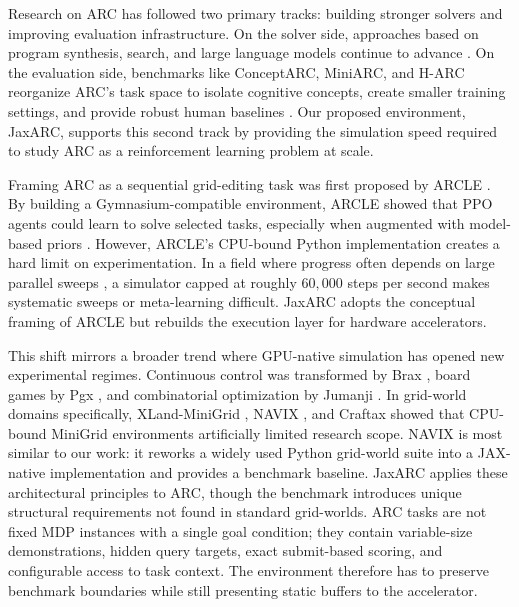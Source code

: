 Research on ARC has followed two primary tracks: building stronger solvers and improving evaluation infrastructure. On the solver side, approaches based on program synthesis, search, and large language models continue to advance \citep{alfordNeuralGuidedBidirectionalProgram2022,buttCodeItSelfimprovingLanguage2024,batorskiNSANeurosymbolicARC2025}. On the evaluation side, benchmarks like ConceptARC, MiniARC, and H-ARC reorganize ARC's task space to isolate cognitive concepts, create smaller training settings, and provide robust human baselines \citep{kimPlaygroundsAbstractionReasoning2022,moskvichevConceptARCBenchmarkEvaluating2023,legrisComprehensiveBehavioralDataset2025}. Our proposed environment, JaxARC, supports this second track by providing the simulation speed required to study ARC as a reinforcement learning problem at scale.

Framing ARC as a sequential grid-editing task was first proposed by ARCLE \citep{leeARCLEAbstractionReasoning2025}. By building a Gymnasium-compatible environment, ARCLE showed that PPO agents could learn to solve selected tasks, especially when augmented with model-based priors \citep{leeEnhancingAnalogicalReasoning2024}. However, ARCLE's CPU-bound Python implementation creates a hard limit on experimentation. In a field where progress often depends on large parallel sweeps \citep{luDiscoveredPolicyOptimisation2022,mayorImpactOnPolicyParallelized2025}, a simulator capped at roughly $60,000$ steps per second makes systematic sweeps or meta-learning difficult. JaxARC adopts the conceptual framing of ARCLE but rebuilds the execution layer for hardware accelerators.

This shift mirrors a broader trend where GPU-native simulation has opened new experimental regimes. Continuous control was transformed by Brax \citep{freemanBraxDifferentiablePhysics2021}, board games by Pgx \citep{koyamadaPgxHardwareAcceleratedParallel2023}, and combinatorial optimization by Jumanji \citep{bonnetJumanjiDiverseSuite2023}. In grid-world domains specifically, XLand-MiniGrid \citep{nikulinXLandMiniGridScalableMetaReinforcement2024}, NAVIX \citep{pignatelliNAVIXScalingMiniGrid2025}, and Craftax \citep{matthewsCraftaxLightningFastBenchmark2024} showed that CPU-bound MiniGrid environments artificially limited research scope. NAVIX is most similar to our work: it reworks a widely used Python grid-world suite into a JAX-native implementation and provides a benchmark baseline. JaxARC applies these architectural principles to ARC, though the benchmark introduces unique structural requirements not found in standard grid-worlds. ARC tasks are not fixed MDP instances with a single goal condition; they contain variable-size demonstrations, hidden query targets, exact submit-based scoring, and configurable access to task context. The environment therefore has to preserve benchmark boundaries while still presenting static buffers to the accelerator.

